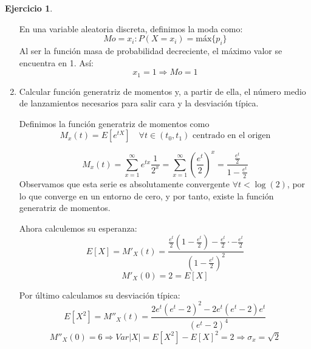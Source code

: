 \documentclass[a4paper, 12pt]{article}
\theoremstyle{definition}
\newtheorem{ej}{Ejercicio}
\begin{document}
\begin{ej}
\begin{enumerate}[label=\textit{\alph*)}]
En una variable aleatoria discreta, definimos la moda como:
\[
	Mo = x_i : P(X=x_i) = \text{máx} \{p_i\}
\]
Al ser la función masa de probabilidad decreciente, el máximo valor se encuentra en 1. Así:
\[
	x_1 = 1 \Rightarrow Mo = 1
\]

	\item Calcular función generatriz de momentos y, a partir de ella, el número medio de lanzamientos necesarios para salir cara y la desviación típica.
	
Definimos la función generatriz de momentos como
\[
M_x(t) = E[e^{tX}] \quad \forall t \in (t_0, t_1) \text{ centrado en el origen}
\]

\[
	M_x(t) = \sum_{x=1}^{\infty} e^{tx} \frac{1}{2^x} = \sum_{x=1}^{\infty} \left( \frac{e^t}{2} \right)^x = \frac{\frac{e^t}{2}}{1- \frac{e^t}{2}}
\]
Observamos que esta serie es absolutamente convergente \(\forall t < \log (2)\), por lo que converge en un entorno de cero, y por tanto, existe la función generatriz de momentos.

Ahora calculemos su esperanza:
\[
	E[X] = M'_X(t) = \frac{\frac{e^t}{2}(1-\frac{e^t}{2}) - \frac{e^t}{2} \cdot - \frac{e^t}{2}}{(1-\frac{e^t}{2})^2}
\]
\[
	M'_X(0) = 2 = E[X]
\]

Por último calculamos su desviación típica:
\[
	E[X^2] = M''_X(t) = \frac{2e^t (e^t -2)^2 - 2e^t (e^t-2)e^t}{(e^t-2)^4}
\]
\[
	M''_X(0) = 6 \Rightarrow Var|X| = E[X^2] - E[X]^2 = 2 \Rightarrow \sigma_x = \sqrt{2}
\]

\end{enumerate}

\end{ej}
\end{document}
